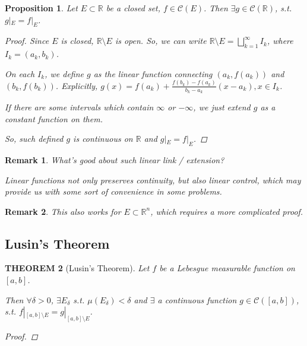 \documentclass[12pt]{article}
\theoremstyle{blueplain}
\newtheorem{theorem}{THEOREM}[section]
\newtheorem{proposition}[theorem]{Proposition}
\theoremstyle{bluedef}
\theoremstyle{blueremark}
\newtheorem{remark}{Remark}[section]
\newcommand{\R}{\mathbb{R}}
\numberwithin{equation}{section}
\begin{document}
\begin{proposition}
  Let $E \subset \R$ be a closed set, $f \in \mathcal{C}(E)$. Then $\exists g \in \mathcal{C}(\R)$, s.t. $g|_E = f|_E$.
  \begin{proof}
    Since $E$ is closed, $\R \setminus E$ is open. So, we can write $\R \setminus E = \bigsqcup_{k=1}^{\infty} I_k$, where $I_k = (a_k, b_k)$.

    On each $I_k$, we define $g$ as the linear function connecting $(a_k, f(a_k))$ and $(b_k, f(b_k))$. Explicitly, $g(x) = f(a_k) + \frac{f(b_k) - f(a_k)}{b_k - a_k}(x - a_k), x \in I_k$.

    If there are some intervals which contain $\infty$ or $-\infty$, we just extend $g$ as a constant function on them.

    So, such defined $g$ is continuous on $\R$ and $g|_E = f|_E$.
  \end{proof}
\end{proposition}

\begin{remark}
  What's good about such linear link / extension?

  Linear functions not only preserves continuity, but also linear control, which may provide us with some sort of convenience in some problems.
\end{remark}

\begin{remark}
  This also works for $E \subset \R^n$, which requires a more complicated proof.
\end{remark}






\clearpage

\subsection{Lusin's Theorem}

\begin{theorem}[Lusin's Theorem]

  Let $f$ be a Lebesgue measurable function on $[a,b]$.

  Then $\forall \delta > 0$, $\exists E_\delta$ s.t. $\mu(E_\delta) < \delta$ and $\exists$ a continuous function $g \in \mathcal{C}([a,b])$, s.t. $f|_{[a,b] \setminus E} = g|_{[a,b] \setminus E}$.

  \begin{proof}

  \end{proof}
\end{theorem}
\end{document}
